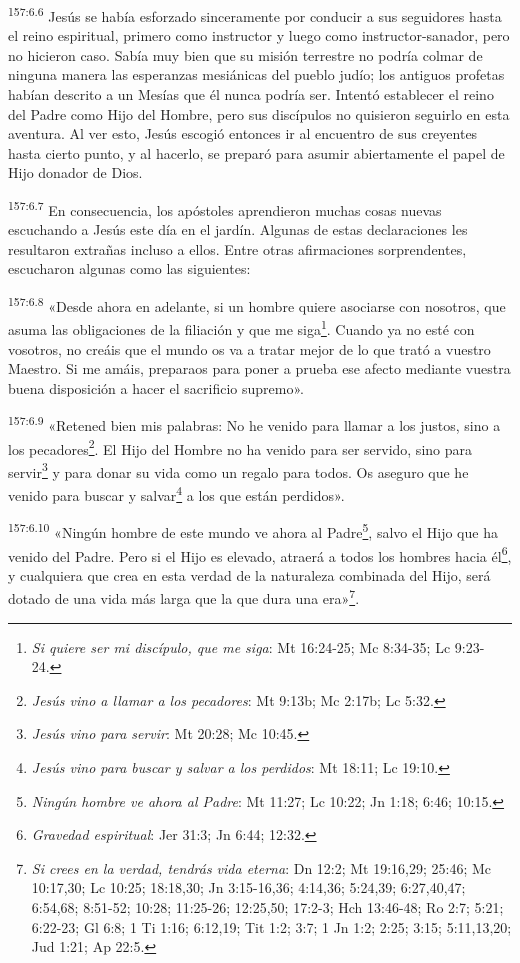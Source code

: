 \par 
\textsuperscript{157:6.6} Jesús se había esforzado sinceramente por conducir a sus seguidores hasta el reino espiritual, primero como instructor y luego como instructor-sanador, pero no hicieron caso. Sabía muy bien que su misión terrestre no podría colmar de ninguna manera las esperanzas mesiánicas del pueblo judío; los antiguos profetas habían descrito a un Mesías que él nunca podría ser. Intentó establecer el reino del Padre como Hijo del Hombre, pero sus discípulos no quisieron seguirlo en esta aventura. Al ver esto, Jesús escogió entonces ir al encuentro de sus creyentes hasta cierto punto, y al hacerlo, se preparó para asumir abiertamente el papel de Hijo donador de Dios.

\par 
\textsuperscript{157:6.7} En consecuencia, los apóstoles aprendieron muchas cosas nuevas escuchando a Jesús este día en el jardín. Algunas de estas declaraciones les resultaron extrañas incluso a ellos. Entre otras afirmaciones sorprendentes, escucharon algunas como las siguientes:

\par 
\textsuperscript{157:6.8} «Desde ahora en adelante, si un hombre quiere asociarse con nosotros, que asuma las obligaciones de la filiación y que me siga\footnote{\textit{Si quiere ser mi discípulo, que me siga}: Mt 16:24-25; Mc 8:34-35; Lc 9:23-24.}. Cuando ya no esté con vosotros, no creáis que el mundo os va a tratar mejor de lo que trató a vuestro Maestro. Si me amáis, preparaos para poner a prueba ese afecto mediante vuestra buena disposición a hacer el sacrificio supremo».

\par 
\textsuperscript{157:6.9} «Retened bien mis palabras: No he venido para llamar a los justos, sino a los pecadores\footnote{\textit{Jesús vino a llamar a los pecadores}: Mt 9:13b; Mc 2:17b; Lc 5:32.}. El Hijo del Hombre no ha venido para ser servido, sino para servir\footnote{\textit{Jesús vino para servir}: Mt 20:28; Mc 10:45.} y para donar su vida como un regalo para todos. Os aseguro que he venido para buscar y salvar\footnote{\textit{Jesús vino para buscar y salvar a los perdidos}: Mt 18:11; Lc 19:10.} a los que están perdidos».

\par 
\textsuperscript{157:6.10} «Ningún hombre de este mundo ve ahora al Padre\footnote{\textit{Ningún hombre ve ahora al Padre}: Mt 11:27; Lc 10:22; Jn 1:18; 6:46; 10:15.}, salvo el Hijo que ha venido del Padre. Pero si el Hijo es elevado, atraerá a todos los hombres hacia él\footnote{\textit{Gravedad espiritual}: Jer 31:3; Jn 6:44; 12:32.}, y cualquiera que crea en esta verdad de la naturaleza combinada del Hijo, será dotado de una vida más larga que la que dura una era»\footnote{\textit{Si crees en la verdad, tendrás vida eterna}: Dn 12:2; Mt 19:16,29; 25:46; Mc 10:17,30; Lc 10:25; 18:18,30; Jn 3:15-16,36; 4:14,36; 5:24,39; 6:27,40,47; 6:54,68; 8:51-52; 10:28; 11:25-26; 12:25,50; 17:2-3; Hch 13:46-48; Ro 2:7; 5:21; 6:22-23; Gl 6:8; 1 Ti 1:16; 6:12,19; Tit 1:2; 3:7; 1 Jn 1:2; 2:25; 3:15; 5:11,13,20; Jud 1:21; Ap 22:5.}.

